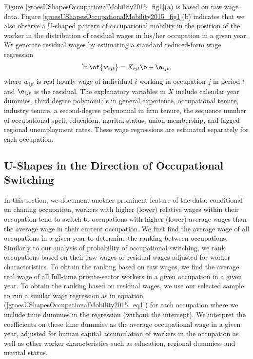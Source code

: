 \documentclass[12pt]{article}
\theoremstyle{definition}
\begin{document}
Figure \ref{groesUShapesOccupationalMobility2015_fig1}(a) is based on raw wage data. Figure \ref{groesUShapesOccupationalMobility2015_fig1}(b) indicates that we also observe a U-shaped pattern of occupational mobility in the position of the worker in the distribution of residual wages in his/her occupation in a given year. We generate residual wages by estimating a standard reduced-form wage regression 
\begin{equation}
    \label{groesUShapesOccupationalMobility2015_eq1}
    \ln\of{w_{ijt}} = X_{ijt} \b + \e_{ijt},
\end{equation}
where $w_{ijt}$ is real hourly wage of individual $i$ working in occupation $j$ in period $t$ and $\e_{ijt}$ is the residual. The explanatory variables in $X$ include calendar year dummies, third degree polynomials in general experience, occupational tenure, industry tenure, a second-degree polynomial in firm tenure, the sequence number of occupational spell, education, marital status, union membership, and lagged regional unemployment rates. These wage regressions are estimated separately for each occupation.

\subsection{U-Shapes in the Direction of Occupational Switching}

In this section, we document another prominent feature of the data: conditional on chaning occupation, workers with higher (lower) relative wages within their occupation tend to switch to occupations with higher (lower) average wages than the average wage in their current occupation. We first find the average wage of all occupations in a given year to determine the ranking between occupations. Similarly to our analysis of probability of occupational switching, we rank occupations based on their raw wages or residual wages adjusted for worker characteristics. To obtain the ranking based on raw wages, we find the average real wage of all full-time private-sector workers in a given occupation in a given year. To obtain the ranking based on residual wages, we use our selected sample to run a similar wage regression as in equation (\ref{groesUShapesOccupationalMobility2015_eq1}) for each occupation where we include time dummies in the regression (without the intercept). We interpret the coefficients on these time dummies as the average occupational wage in a given year, adjusted for human capital accumulation of workers in the occupation as well as other worker characteristics such as education, regional dummies, and marital status.
\end{document}

